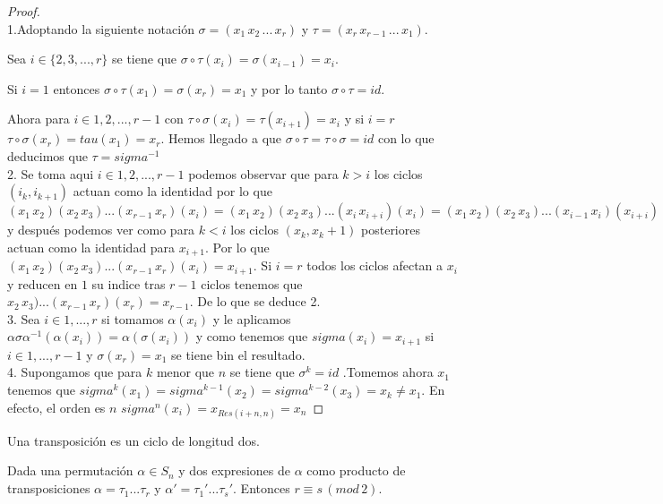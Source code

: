\begin{proof}
  \\
  1.Adoptando la siguiente notación $\sigma = (x_1 \, x_2 \, ... \, x_r)$ y $\tau = (x_r \, x_{r-1} \, ... \, x_1)$.
  
  Sea $i \in \{2,3,...,r\}$ se tiene que $\sigma \circ \tau (x_i) = \sigma(x_{i-1}) = x_i$.

  Si $i = 1$ entonces $\sigma \circ \tau (x_1) = \sigma(x_r) = x_1$ y por lo tanto $\sigma \circ \tau = id$. 

  Ahora para $i \in {1,2,...,r-1}$ con $\tau \circ \sigma (x_i) = \tau(x_{i+1}) = x_i $ y si $i = r$ $\tau \circ \sigma(x_r)= tau(x_1) =x_r$. Hemos llegado a que $\sigma \circ \tau = \tau \circ \sigma = id$ con lo que deducimos que $\tau = sigma^{-1}$
\\
  2. Se toma aqui $i \in {1,2,...,r-1}$ podemos observar que para $k > i$ los ciclos $(i_k, i_{k+1})$ actuan como la identidad por lo que $(x_1 \, x_2)(x_2 \, x_3)...(x_{r-1} \, x_r)(x_i) = (x_1 \, x_2)(x_2 \, x_3)...(x_{i} \, x_{i+i})(x_i) = (x_1 \, x_2)(x_2 \, x_3)...(x_{i-1} \, x_{i})(x_{i+i})$ y después podemos ver como para $k<i$ los ciclos $(x_k,x_k+1)$ posteriores actuan como la identidad para $x_{i+1}$. Por lo que $(x_1 \, x_2)(x_2 \, x_3)...(x_{r-1} \, x_r)(x_i) = x_{i+1}$. Si $i =r$ todos los ciclos afectan a $x_i$ y reducen en $1$ su indice tras $r-1$ ciclos tenemos que $x_2 \, x_3)...(x_{r-1} \, x_r)(x_r) = x_{r-1}$. De lo que se deduce 2.
\\
  3. Sea $i \in {1,...,r}$ si tomamos $\alpha(x_i)$ y le aplicamos $\alpha \sigma \alpha^{-1} (\alpha(x_i)) = \alpha(\sigma(x_i))$ y como tenemos que $sigma(x_i) = x_{i+1}$ si $ i \in {1,...,r-1} $ y $\sigma(x_r) = x_1$ se tiene bin el resultado.
\\
  4. Supongamos que para $k$ menor que $n$ se tiene que $\sigma^k = id$ .Tomemos ahora $x_1$ tenemos que $sigma^k(x_1) = sigma^{k-1}(x_2) = sigma^{k-2}(x_3) =x_k \neq x_1$. En efecto, el orden es $n$ $sigma^{n}(x_i) =x_{Res(i+n,n)}= x_n$ 

\end{proof}

\begin{definition}[Transposición]
Una transposición es un ciclo de longitud dos.
\end{definition}

\begin{theorem}\label{theorem:paridad-permutacion} 
Dada una permutación $\alpha \in S_n$ y dos expresiones de $\alpha$ como producto de transposiciones $\alpha = \tau_1...\tau_r$ y $\alpha' = \tau_1'...\tau_s'$. Entonces $r \equiv s \, (mod \, 2)$.
\end{theorem}

